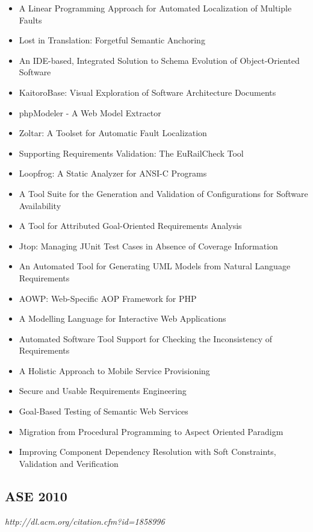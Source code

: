{\begin{itemize}[itemsep=-1ex]
  \item A Linear Programming Approach for Automated Localization of Multiple Faults
  \item Lost in Translation: Forgetful Semantic Anchoring
  \item An IDE-based, Integrated Solution to Schema Evolution of Object-Oriented Software
  \item KaitoroBase: Visual Exploration of Software Architecture Documents
  \item phpModeler - A Web Model Extractor
  \item Zoltar: A Toolset for Automatic Fault Localization
  \item Supporting Requirements Validation: The EuRailCheck Tool
  \item Loopfrog: A Static Analyzer for ANSI-C Programs
  \item A Tool Suite for the Generation and Validation of Configurations for Software Availability
  \item A Tool for Attributed Goal-Oriented Requirements Analysis
  \item Jtop: Managing JUnit Test Cases in Absence of Coverage Information
  \item An Automated Tool for Generating UML Models from Natural Language Requirements
  \item AOWP: Web-Specific AOP Framework for PHP
  \item A Modelling Language for Interactive Web Applications
  \item Automated Software Tool Support for Checking the Inconsistency of Requirements
  \item A Holistic Approach to Mobile Service Provisioning
  \item Secure and Usable Requirements Engineering
  \item Goal-Based Testing of Semantic Web Services
  \item Migration from Procedural Programming to Aspect Oriented Paradigm
  \item Improving Component Dependency Resolution with Soft Constraints, Validation and Verification
\end{itemize}
}

\subsection{ASE 2010}

{\small \em http://dl.acm.org/citation.cfm?id=1858996}

